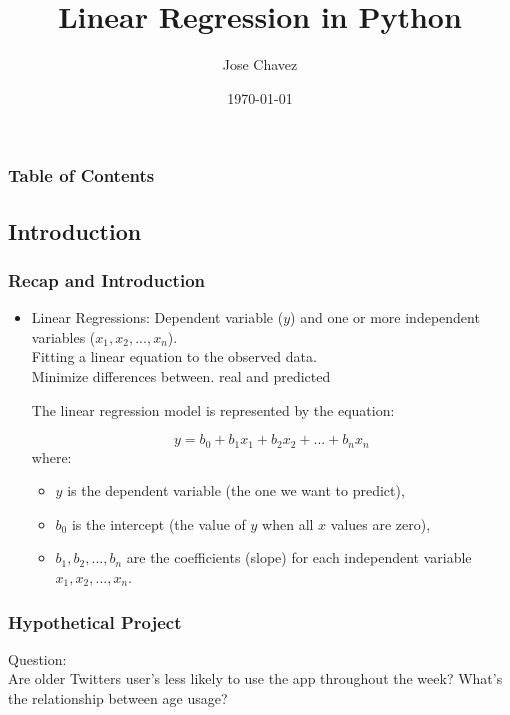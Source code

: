 \documentclass{beamer}
\title{Linear Regression in Python}
\author{Jose Chavez}
\date{\today}
\newcounter{slidenum}
\begin{document}
\frame{\titlepage}

\begin{frame}
\frametitle{Table of Contents}
\tableofcontents
\end{frame}


\begin{frame}
\section{Introduction}
\frametitle{Recap and Introduction}
\begin{itemize}
\item Linear Regressions: 
	Dependent variable ($y$) and one or more independent variables ($x_1, x_2, ..., x_n$).\\
	Fitting a linear equation to the observed data. \\
	Minimize differences between. real and predicted

The linear regression model is represented by the equation:

\[ y = b_0 + b_1x_1 + b_2x_2 + ... + b_nx_n \]
where:
\begin{itemize}
    \item $y$ is the dependent variable (the one we want to predict),
    \item $b_0$ is the intercept (the value of $y$ when all $x$ values are zero),
    \item $b_1, b_2, ..., b_n$ are the coefficients (slope) for each independent variable $x_1, x_2, ..., x_n$.
\end{itemize}

\end{itemize}
\end{frame}

\begin{frame}
	\frametitle{Hypothetical Project}

	Question:\\
	Are older Twitters user's less likely to use the app throughout the week? What's the
	relationship between age usage? 

\end{frame}
\end{document}
